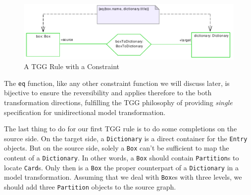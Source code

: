 \begin{enumerate}
\begin{figure}[htbp]
\begin{center}
  \includegraphics[width=\textwidth]{pics/tggBilder/tggRule/tgg14}
  \caption{A TGG Rule with a Constraint}  
  \label{fig:tgg_rule_with_constraint}
\end{center}
\end{figure}

\end{enumerate} 

The \texttt{eq} function, like any other constraint function we will discuss later, is bijective to ensure the reversibility and applies therefore to the both transformation directions, fulfilling the TGG philosophy of providing \emph{single} specification for unidirectional model transformation.

The last thing to do for our first TGG rule is to do some completions on the source side. 
On the target side, a \texttt{Dictionary} is a direct container for the \texttt{Entry} objects. But on the source side, solely a \texttt{Box} can't be sufficient to map the content of a \texttt{Dictionary}. 
In other words, a \texttt{Box} should contain \texttt{Partition}s to locate \texttt{Card}s. 
Only then is a \texttt{Box} the proper counterpart of a \texttt{Dictionary} in a model transformation. 
Assuming that we deal with \texttt{Box}es with three levels, we should add three \texttt{Partition} objects to the source graph. 

